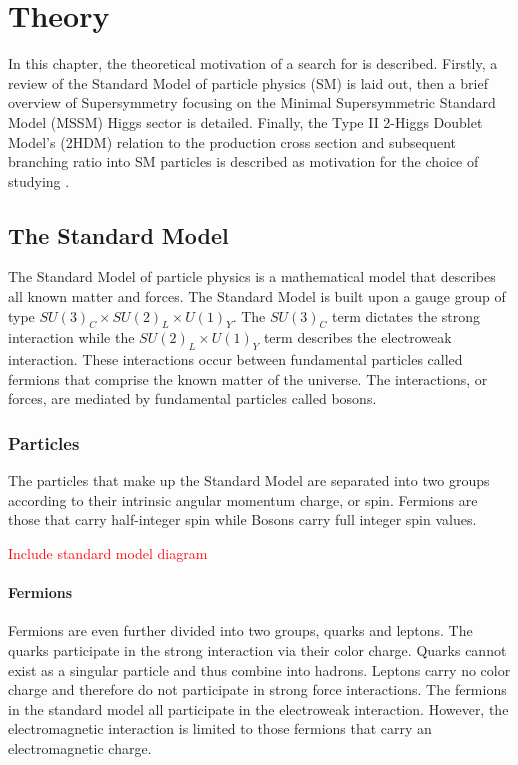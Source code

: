 \chapter{Theory}
    In this chapter, the theoretical motivation of a search for \HpLong is described. Firstly, a review of the Standard Model of particle physics (SM) is laid out, then a brief overview of Supersymmetry focusing on the Minimal Supersymmetric Standard Model (MSSM) Higgs sector is detailed. Finally, the Type II 2-Higgs Doublet Model's (2HDM) relation to the \Hp production cross section and subsequent branching ratio into SM particles is described as motivation for the choice of studying \HpLong.

\section{The Standard Model}
	The Standard Model of particle physics is a mathematical model that describes all known matter and forces. The Standard Model is built upon a gauge group of type $SU(3)_C \times SU(2)_L \times U(1)_Y$. The $SU(3)_C$ term dictates the strong interaction while the $SU(2)_L \times U(1)_Y$ term describes the electroweak interaction. These interactions occur between fundamental particles called fermions that comprise the known matter of the universe. The interactions, or forces, are mediated by fundamental particles called bosons. 

	\subsection{Particles}        
		The particles that make up the Standard Model are separated into two groups according to their intrinsic angular momentum charge, or spin. Fermions are those that carry half-integer spin while Bosons carry full integer spin values.


		\textcolor{red}{Include standard model diagram}

		\subsubsection{Fermions}	
		Fermions are even further divided into two groups, quarks and leptons. The quarks participate in the strong interaction via their color charge. Quarks cannot exist as a singular particle and thus combine into hadrons. Leptons carry no color charge and therefore do not participate in strong force interactions. The fermions in the standard model all participate in the electroweak interaction. However, the electromagnetic interaction is limited to those fermions that carry an electromagnetic charge.


